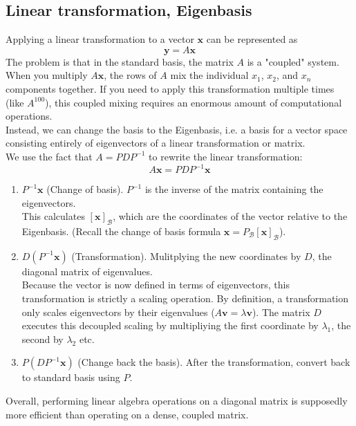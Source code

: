 \documentclass[../linear-algebra.tex]{subfiles}
\begin{document}
\subsection{Linear transformation, Eigenbasis}
Applying a linear transformation to a vector $\mathbf{x}$ can be represented as
$$\mathbf{y} = A\mathbf{x}$$
The problem is that in the standard basis, the matrix $A$ is a "coupled" system. When you multiply $A\mathbf{x}$, the rows of $A$ mix the individual $x_1$, $x_2$, and $x_n$ components together.
If you need to apply this transformation multiple times (like $A^{100}$), this coupled mixing requires an enormous amount of computational operations.\\
Instead, we can change the basis to the Eigenbasis, i.e. a basis for a vector space consisting entirely of eigenvectors of a linear transformation or matrix.\\
We use the fact that $A = PDP^{-1}$ to rewrite the linear transformation:
$$A\mathbf{x} = PDP^{-1}\mathbf{x}$$
\begin{enumerate}
    \item $P^{-1}\mathbf{x}$ (Change of basis). $P^{-1}$ is the inverse of the matrix containing the eigenvectors.\\
    This calculates $[\mathbf{x}]_\mathcal{B}$, which are the coordinates of the vector relative to the Eigenbasis. (Recall the change of basis formula $\mathbf{x} = P_\mathcal{B}[\mathbf{x}]_\mathcal{B}$).
    \item $D(P^{-1}\mathbf{x})$ (Transformation). Mulitplying the new coordinates by $D$, the diagonal matrix of eigenvalues.\\
    Because the vector is now defined in terms of eigenvectors, this transformation is strictly a scaling operation. 
    By definition, a transformation only scales eigenvectors by their eigenvalues ($A\mathbf{v} = \lambda\mathbf{v}$).
    The matrix $D$ executes this decoupled scaling by multipliying the first coordinate by $\lambda_1$, the second by $\lambda_2$ etc.
    \item $P(DP^{-1}\mathbf{x})$ (Change back the basis). After the transformation, convert back to standard basis using $P$.
\end{enumerate}
Overall, performing linear algebra operations on a diagonal matrix is supposedly more efficient than operating on a dense, coupled matrix.
\end{document}
